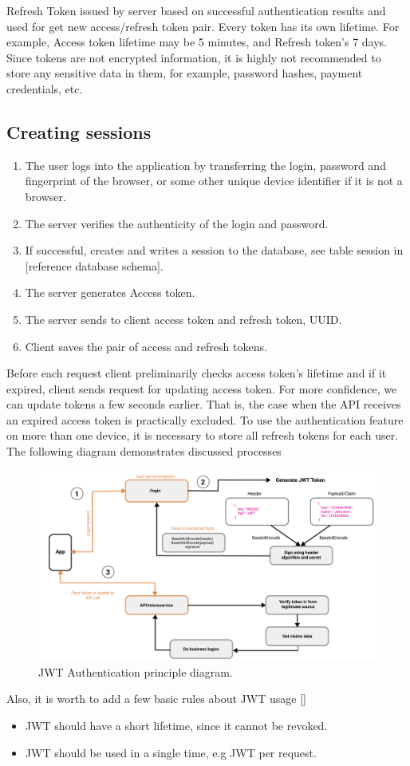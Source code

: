 Refresh Token issued by server based on successful authentication results and used for get new access/refresh token pair.
Every token has its own lifetime.
For example, Access token lifetime may be 5 minutes, and Refresh token's 7 days.
Since tokens are not encrypted information, it is highly not recommended to store any sensitive data in them, for example,
password hashes, payment credentials, etc.

\subsection{Creating sessions}\label{subsec:creating-sessions}

\begin{enumerate}
    \item The user logs into the application by transferring the login, password and fingerprint of the browser,
    or some other unique device identifier if it is not a browser.
    \item The server verifies the authenticity of the login and password.
    \item If successful, creates and writes a session to the database, see table session in [reference database schema].
    \item The server generates Access token.
    \item The server sends to client access token and refresh token, UUID\@.
    \item Client saves the pair of access and refresh tokens.
\end{enumerate}

Before each request client preliminarily checks access token's lifetime and if it expired, client sends request for
updating access token.
For more confidence, we can update tokens a few seconds earlier.
That is, the case when the API receives an expired access token is practically excluded.
To use the authentication feature on more than one device, it is necessary to store all refresh tokens for each user.
The following diagram demonstrates discussed processes

\begin{figure}[H]
    \centering
    \includegraphics[width=1\textwidth]{Pictures/jwt_auth_scheme.pdf}
    \caption{JWT Authentication principle diagram.}\label{fig:figure3}
\end{figure}

Also, it is worth to add a few basic rules about JWT usage [\cite{RDegges}]
\begin{itemize}
    \item JWT should have a short lifetime, since it cannot be revoked.
    \item JWT should be used in a single time, e.g JWT per request.
\end{itemize}